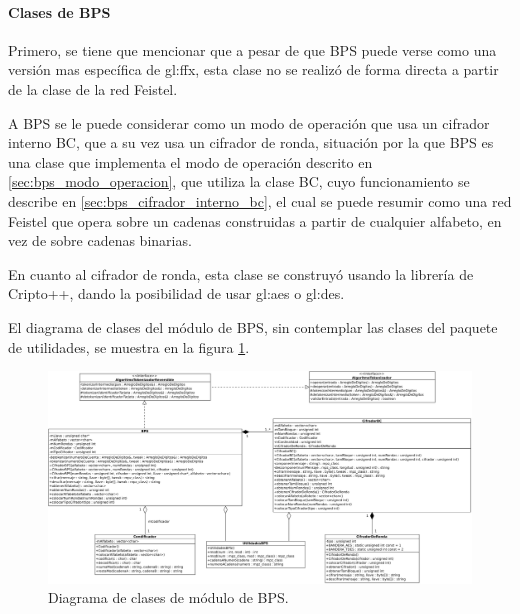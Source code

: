 %
%
%

\paragraph{Clases de BPS}

Primero, se tiene que mencionar que a pesar de que BPS puede verse como una
versión mas específica de \gls{gl:ffx}, esta clase no se realizó de forma
directa a partir de la clase de la red Feistel.

A BPS se le puede considerar como un modo de operación que usa un cifrador
interno BC, que a su vez usa un cifrador de ronda, situación por la que BPS
es una clase que implementa el modo de operación descrito en
\ref{sec:bps_modo_operacion}, que utiliza la clase BC, cuyo funcionamiento se
describe en \ref{sec:bps_cifrador_interno_bc}, el cual se puede resumir como
una red Feistel que opera sobre un cadenas construidas a partir de cualquier
alfabeto, en vez de sobre cadenas binarias.

En cuanto al cifrador de ronda, esta clase se construyó usando la librería de
Cripto++, dando la posibilidad de usar \gls{gl:aes} o \gls{gl:des}.

El diagrama de clases del módulo de BPS, sin contemplar las clases del paquete
de utilidades, se muestra en la figura \ref{diagrama_clases_bps}.

\begin{figure}
  \begin{center}
    \includegraphics[width=1.0\linewidth]{diagramas/bps.png}
    \caption{Diagrama de clases de módulo de BPS.}
    \label{diagrama_clases_bps}
  \end{center}
\end{figure}
